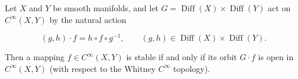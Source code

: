 Let $X$ and $Y$ be smooth manifolds, and let $G = \operatorname{Diff}(X) \times \operatorname{Diff}(Y)$ act on $C^\infty(X, Y)$ by the natural action

$$
(g, h) \cdot f = h \circ f \circ g^{-1}, \qquad (g, h) \in \operatorname{Diff}(X) \times \operatorname{Diff}(Y).
$$

Then a mapping $f \in C^\infty(X, Y)$ is stable if and only if its orbit $G \cdot f$ is open in $C^\infty(X, Y)$ (with respect to the Whitney $C^\infty$ topology).
